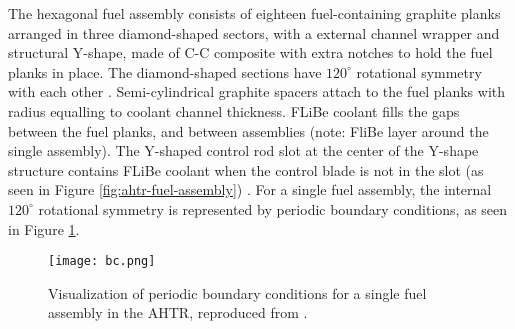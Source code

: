 The hexagonal fuel assembly consists of eighteen fuel-containing graphite planks 
arranged in three diamond-shaped sectors, with a external channel wrapper and 
structural Y-shape, made of C-C composite with extra notches to hold the fuel 
planks in place. 
The diamond-shaped sections have $120^\circ{}$ rotational symmetry with each other 
\cite{varma_ahtr_2012,ramey_monte_2018,petrovic_benchmark_2021}. 
Semi-cylindrical graphite spacers attach to the fuel planks with radius equalling to 
coolant channel thickness. 
\gls{FLiBe} coolant fills the gaps between the fuel planks, and between 
assemblies (note: FliBe layer around the single assembly). 
The Y-shaped control rod slot at the center of the Y-shape structure contains 
\gls{FLiBe} coolant when the control blade is not in the slot (as seen in 
Figure \ref{fig:ahtr-fuel-assembly})
\cite{varma_ahtr_2012,ramey_monte_2018,petrovic_benchmark_2021}.
For a single fuel assembly, the internal $120^\circ{}$ rotational symmetry is 
represented by periodic boundary conditions, as seen in Figure \ref{fig:bc}. 
\begin{figure}[htbp]
    \centering
    \texttt{[image: bc.png]} 
    \caption{Visualization of periodic boundary conditions for a single fuel 
    assembly in the \acrfull{AHTR}, reproduced from \cite{petrovic_benchmark_2021}.}
    \label{fig:bc}
\end{figure}

